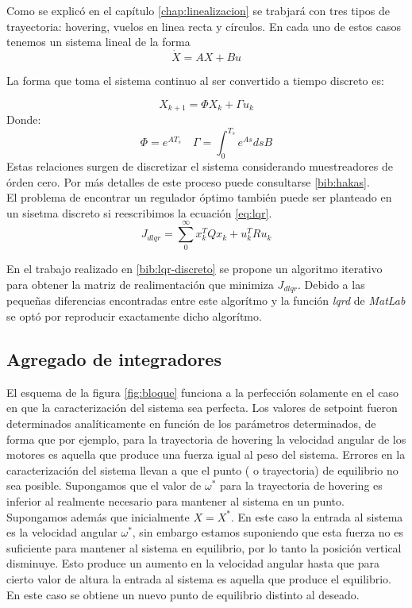 \documentclass[main]{subfiles}
\begin{document}
Como se explic\'o en el cap\'itulo \ref{chap:linealizacion} se trabjar\'a con tres tipos de trayectoria: hovering, vuelos en linea recta y c\'irculos. En cada uno de estos casos tenemos un sistema lineal de la forma 
\begin{equation}
\dot{X} = A X + Bu
\end{equation}
 
La forma que toma el sistema continuo al ser convertido a tiempo discreto es: 

\begin{equation}
X_{k+1} = \Phi X_k + \Gamma u_k
\end{equation}
Donde:
\begin{equation}
\Phi = e^{AT_s} \quad \Gamma = \int_0^{T_s} e^{A s} ds B
\end{equation}
Estas relaciones surgen de discretizar el sistema considerando muestreadores de \'orden cero. Por m\'as detalles de este proceso puede consultarse \ref{bib:hakas}.\\

El problema de encontrar un regulador \'optimo tambi\'en puede ser planteado en un sisetma discreto si reescribimos la ecuaci\'on \ref{eq:lqr}. 
\begin{equation}
\label{eq:dlqr}
J_{dlqr} = \sum_0^\infty x_k^T Q x_k + u_k^T R u_k
\end{equation}

En el trabajo realizado en \ref{bib:lqr-discreto} se propone un algoritmo iterativo para obtener la matriz de realimentaci\'on que minimiza $J_{dlqr}$. Debido a las pequeñas diferencias encontradas entre este algor\'itmo y la funci\'on \emph{lqrd} de \emph{MatLab}  se opt\'o por reproducir exactamente dicho algor\'itmo.

\subsection{Agregado de integradores}

El esquema de la figura \ref{fig:bloque} funciona a la perfecci\'on solamente en el caso en que la caracterizaci\'on del sistema sea perfecta. Los valores de setpoint fueron determinados anal\'iticamente en funci\'on de los par\'ametros determinados, de forma que por ejemplo, para la trayectoria de hovering la velocidad angular de los motores es aquella que produce una fuerza igual al peso del sistema. Errores en la caracterizaci\'on del sistema llevan a que el punto ( o trayectoria) de equilibrio no sea posible. Supongamos que el valor de $\omega^*$ para la trayectoria de hovering es inferior al realmente necesario para mantener al sistema en un punto. Supongamos adem\'as que inicialmente $X = X^*$. En este caso la entrada al sistema es la velocidad angular $\omega^*$, sin embargo estamos suponiendo que esta fuerza no es suficiente para mantener al sistema en equilibrio, por lo tanto la posici\'on vertical disminuye. Esto produce un aumento en la velocidad angular hasta que para cierto valor de altura la entrada al sistema es aquella que produce el equilibrio. En este caso se obtiene un nuevo punto de equilibrio distinto al deseado. \\
\end{document}
